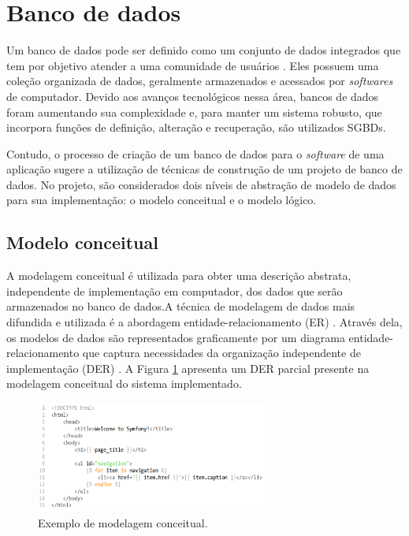 \section{Banco de dados}
\label{fundBD}

Um banco de dados pode ser definido como um conjunto de dados integrados que tem por objetivo atender a uma comunidade de usuários \cite{heuser}. Eles possuem uma coleção organizada de dados, geralmente armazenados e acessados por \textit{softwares} de computador. Devido aos avanços tecnológicos nessa área, bancos de dados foram aumentando sua complexidade e, para manter um sistema robusto, que incorpora funções de definição, alteração e recuperação, são utilizados SGBDs.

Contudo, o processo de criação de um banco de dados para o \textit{software} de uma aplicação sugere a utilização de técnicas de construção de um projeto de banco de dados. No projeto, são considerados dois níveis de abstração de modelo de dados para sua implementação: o modelo conceitual e o modelo lógico.

\subsection{Modelo conceitual}
\label{fundBDModelagem}

A modelagem conceitual é utilizada para obter uma descrição abstrata, independente de implementação em computador, dos dados que serão armazenados no banco de dados.A técnica de modelagem de dados mais difundida e utilizada é a abordagem entidade-relacionamento (ER) \cite{heuser}. Através dela, os modelos de dados são representados graficamente por um diagrama entidade-relacionamento que captura necessidades da organização independente de implementação (DER) \cite{peterChen1976}. A Figura \ref{modelagemBDExemplol} apresenta um DER parcial presente na modelagem conceitual do sistema implementado.

\begin{figure}[h]
    \caption{Exemplo de modelagem conceitual.}
       	\begin{center}
            \includegraphics[width=0.68\textwidth]{figuras/twig-symf.png}
        \end{center}
    \label{modelagemBDExemplol}
\end{figure}

